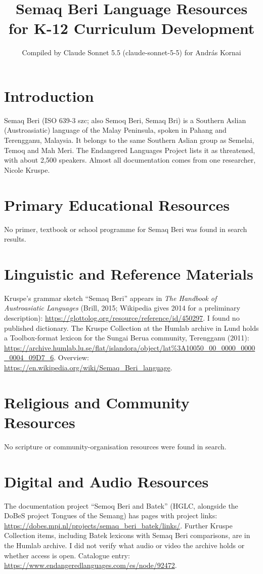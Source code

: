 \documentclass[12pt]{article}
\title{Semaq Beri Language Resources for K-12 Curriculum Development}
\author{Compiled by Claude Sonnet 5.5 (claude-sonnet-5-5) for Andr\'as Kornai}
\date{}
\begin{document}
\maketitle

\section{Introduction}
Semaq Beri (ISO 639-3 szc; also Semoq Beri, Semaq Bri) is a Southern Aslian (Austroasiatic) language of the Malay Peninsula, spoken in Pahang and Terengganu, Malaysia. It belongs to the same Southern Aslian group as Semelai, Temoq and Mah Meri. The Endangered Languages Project lists it as threatened, with about 2,500 speakers. Almost all documentation comes from one researcher, Nicole Kruspe.

\section{Primary Educational Resources}
No primer, textbook or school programme for Semaq Beri was found in search results.

\section{Linguistic and Reference Materials}
Kruspe's grammar sketch ``Semaq Beri'' appears in \emph{The Handbook of Austroasiatic Languages} (Brill, 2015; Wikipedia gives 2014 for a preliminary description): \url{https://glottolog.org/resource/reference/id/450297}. I found no published dictionary. The Kruspe Collection at the Humlab archive in Lund holds a Toolbox-format lexicon for the Sungai Berua community, Terengganu (2011): \url{https://archive.humlab.lu.se/flat/islandora/object/lat%3A10050_00_0000_0000_0004_09D7_6}. Overview: \url{https://en.wikipedia.org/wiki/Semaq_Beri_language}.

\section{Religious and Community Resources}
No scripture or community-organisation resources were found in search.

\section{Digital and Audio Resources}
The documentation project ``Semoq Beri and Batek'' (HGLC, alongside the DoBeS project Tongues of the Semang) has pages with project links: \url{https://dobes.mpi.nl/projects/semaq_beri_batek/links/}. Further Kruspe Collection items, including Batek lexicons with Semaq Beri comparisons, are in the Humlab archive. I did not verify what audio or video the archive holds or whether access is open. Catalogue entry: \url{https://www.endangeredlanguages.com/es/node/92472}.
\end{document}
